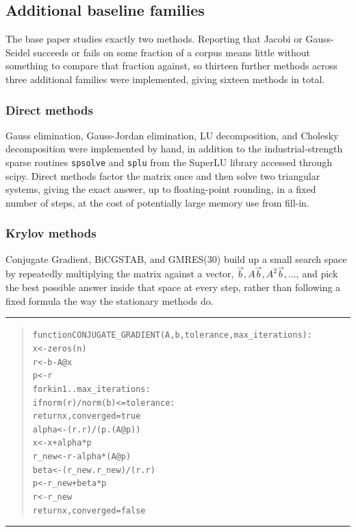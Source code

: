 \documentclass[11pt,a4paper]{article}
\newcommand{\code}[1]{\texttt{\footnotesize #1}}
\newenvironment{pseudobox}
  {\begin{center}\color{SBgold}\rule{0.92\linewidth}{0.8pt}\end{center}\vspace{-2pt}
   \begin{quote}\small\color{SBnavy}
   \begin{alltt}\ttfamily}
  {\end{alltt}\end{quote}\vspace{-6pt}\begin{center}\color{SBgold}\rule{0.92\linewidth}{0.8pt}\end{center}}
\begin{document}
\subsection{Additional baseline families}
\label{sec:methods-baselines}

The base paper studies exactly two methods. Reporting that Jacobi or Gauss-Seidel
succeeds or fails on some fraction of a corpus means little without something to compare
that fraction against, so thirteen further methods across three additional families were
implemented, giving sixteen methods in total.

\subsubsection{Direct methods}
\label{sec:methods-direct}

Gauss elimination, Gauss-Jordan elimination, LU decomposition, and Cholesky decomposition
were implemented by hand, in addition to the industrial-strength sparse routines
\code{spsolve} and \code{splu} from the SuperLU library accessed through scipy. Direct
methods factor the matrix once and then solve two triangular systems, giving the exact
answer, up to floating-point rounding, in a fixed number of steps, at the cost of
potentially large memory use from fill-in.

\subsubsection{Krylov methods}
\label{sec:methods-krylov}

Conjugate Gradient, BiCGSTAB, and GMRES(30) build up a small search space by repeatedly
multiplying the matrix against a vector, $\vec{b}, A\vec{b}, A^2\vec{b}, \ldots$, and pick
the best possible answer inside that space at every step, rather than following a fixed
formula the way the stationary methods do.

\begin{pseudobox}
function CONJUGATE_GRADIENT(A, b, tolerance, max_iterations):
    x <- zeros(n)
    r <- b - A @ x
    p <- r
    for k in 1 .. max_iterations:
        if norm(r) / norm(b) <= tolerance:
            return x, converged = true
        alpha <- (r . r) / (p . (A @ p))
        x <- x + alpha * p
        r_new <- r - alpha * (A @ p)
        beta <- (r_new . r_new) / (r . r)
        p <- r_new + beta * p
        r <- r_new
    return x, converged = false
\end{pseudobox}
\end{document}
